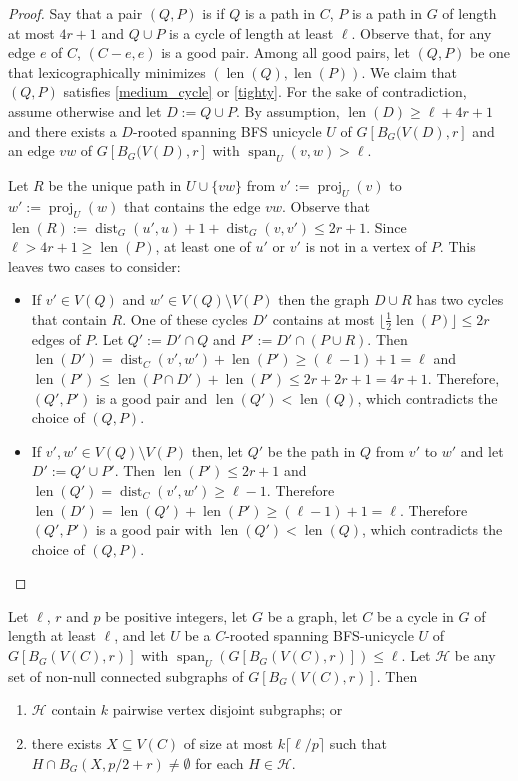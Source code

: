 \documentclass{patmorin}
\DeclareMathOperator{\len}{len}
\DeclareMathOperator{\proj}{proj}
\DeclareMathOperator{\spn}{span}
\DeclareMathOperator{\dist}{dist}
\begin{document}
\begin{proof}
  Say that a pair $(Q,P)$ is  if $Q$ is a path in $C$, $P$ is a path in $G$ of length at most $4r+1$ and $Q\cup P$ is a cycle of length at least $\ell$. Observe that, for any edge $e$ of $C$, $(C-e,e)$ is a good pair.  Among all good pairs, let $(Q,P)$ be one that lexicographically minimizes $(\len(Q),\len(P))$.  We claim that $(Q,P)$ satisfies \ref{medium_cycle} or \ref{tighty}.  For the sake of contradiction, assume otherwise and let $D:=Q\cup P$. By assumption, $\len(D)\ge\ell+4r+1$ and there exists a $D$-rooted spanning BFS unicycle $U$ of $G[B_G(V(D),r]$ and an edge $vw$ of $G[B_G(V(D),r]$ with $\spn_U(v,w)>\ell$.

  Let $R$ be the unique path in $U\cup\{vw\}$ from $v':=\proj_U(v)$ to $w':=\proj_U(w)$ that contains the edge $vw$.  Observe that $\len(R):=\dist_G(u',u)+1+\dist_G(v,v')\le 2r+1$.  Since $\ell>4r+1\ge \len(P)$, at least one of $u'$ or $v'$ is not in a vertex of $P$. This leaves two cases to consider:
  \begin{itemize}%
    \item If $v'\in V(Q)$ and $w'\in V(Q)\setminus V(P)$ then the graph $D\cup R$ has two cycles that contain $R$.  One of these cycles $D'$ contains at most $\lfloor\tfrac{1}{2}\len(P)\rfloor\le 2r$ edges of $P$.  Let $Q':=D'\cap Q$ and $P':=D'\cap (P\cup R)$.    Then $\len(D')= \dist_{C}(v',w')+\len(P') \ge (\ell-1)+1=\ell$ and $\len(P')\le \len(P\cap D')+\len(P')\le 2r+2r+1=4r+1$. Therefore, $(Q',P')$ is a good pair and $\len(Q')<\len(Q)$, which contradicts the choice of $(Q,P)$.

    \item If $v',w'\in V(Q)\setminus V(P)$ then, let $Q'$ be the path in $Q$ from $v'$ to $w'$ and let $D':=Q'\cup P'$.  Then $\len(P')\le 2r+1$ and $\len(Q')=\dist_C(v',w')\ge \ell-1$.  Therefore $\len(D')=\len(Q')+\len(P')\ge (\ell-1)+1=\ell$. Therefore $(Q',P')$ is a good pair with $\len(Q')<\len(Q)$, which contradicts the choice of $(Q,P)$. \qedhere
  \end{itemize}
\end{proof}

\begin{lem}
  Let $\ell$, $r$ and $p$ be positive integers, let $G$ be a graph, let $C$ be a cycle in $G$ of length at least $\ell$, and let $U$ be a $C$-rooted spanning BFS-unicycle $U$ of $G[B_G(V(C),r)]$ with $\spn_U(G[B_G(V(C),r)])\le\ell$. Let $\mathcal{H}$ be any set of non-null connected subgraphs of $G[B_G(V(C),r)]$. Then
  \begin{enumerate}[nosep,nolistsep,label=\rm(\alph*),ref=(\alph*)]
    \item\label{packing} $\mathcal{H}$ contain $k$ pairwise vertex disjoint subgraphs; or
    \item\label{hitting} there exists $X\subseteq V(C)$ of size at most $k\lceil\ell/p\rceil$ such that $H\cap B_G(X,p/2+r)\neq\emptyset$ for each $H\in\mathcal{H}$.
  \end{enumerate}
\end{lem}
\end{document}
